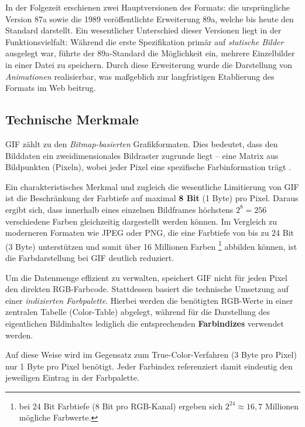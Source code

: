 \documentclass[a4paper,11pt]{scrartcl}
\theoremstyle{definition} %
\begin{document}
\smallskip
In der Folgezeit erschienen zwei Hauptversionen des Formats: die ursprüngliche Version \glqq 87a\grqq{} sowie die 1989 veröffentlichte Erweiterung \glqq 89a\grqq{}, welche bis heute den Standard darstellt. Ein wesentlicher Unterschied dieser Versionen liegt in der Funktionsvielfalt: Während die erste Spezifikation primär auf \textit{statische Bilder} ausgelegt war, führte der \glqq 89a\grqq-Standard die Möglichkeit ein, mehrere Einzelbilder in einer Datei zu speichern. Durch diese Erweiterung wurde die Darstellung von \textit{Animationen} realisierbar, was maßgeblich zur langfristigen Etablierung des Formats im Web beitrug.

\subsection{Technische Merkmale}
GIF zählt zu den \textit{Bitmap-basierten} Grafikformaten. Dies bedeutet, dass den Bilddaten ein zweidimensionales Bildraster zugrunde liegt -- eine Matrix aus Bildpunkten (Pixeln), wobei jeder Pixel eine spezifische Farbinformation trägt \parencite{adobe_raster_basics}.

Ein charakteristisches Merkmal und zugleich die wesentliche Limitierung von GIF ist die Beschränkung der Farbtiefe auf maximal \textbf{8 Bit} (1 Byte) pro Pixel.
Daraus ergibt sich, dass innerhalb eines einzelnen Bildframes höchstens $2^8 = 256$ verschiedene Farben gleichzeitig dargestellt werden können. Im Vergleich zu moderneren Formaten wie JPEG oder PNG, die eine Farbtiefe von bis zu 24 Bit (3 Byte) unterstützen und somit über 16 Millionen Farben
\footnote{bei 24 Bit Farbtiefe (8 Bit pro RGB-Kanal) ergeben sich $2^{24} \approx 16{,}7$ Millionen mögliche Farbwerte.}
abbilden können, ist die Farbdarstellung bei GIF deutlich reduziert.

Um die Datenmenge effizient zu verwalten, speichert GIF nicht für jeden Pixel den direkten RGB-Farbcode. Stattdessen basiert die technische Umsetzung auf einer \textit{indizierten Farbpalette}. Hierbei werden die benötigten RGB-Werte in einer zentralen Tabelle (Color-Table) abgelegt, während für die Darstellung des eigentlichen Bildinhaltes lediglich die entsprechenden \textbf{Farbindizes} verwendet werden.

Auf diese Weise wird im Gegensatz zum True-Color-Verfahren (3 Byte pro Pixel) nur 1 Byte pro Pixel benötigt. Jeder Farbindex referenziert damit eindeutig den jeweiligen Eintrag in der Farbpalette.
\end{document}
